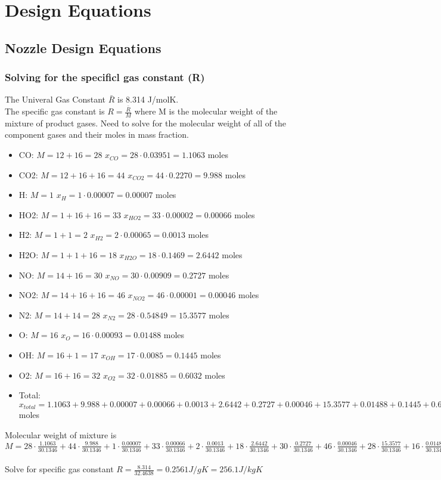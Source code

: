 \documentclass[12pt, letter paper]{article}
\begin{document}
	\section{Design Equations}
		\subsection{Nozzle Design Equations}
			\subsubsection{Solving for the specificl gas constant (R)}
				The Univeral Gas Constant $ \bar{R} $ is 8.314 J/molK. \\
				The specific gas constant is $ R = \frac{\bar{R}}{M} $ where M is the molecular weight of the mixture of product gases.
				Need to solve for the molecular weight of all of the component gases and their moles in mass fraction.
				\begin{itemize}
					\item CO: $ M = 12 +16 = 28 $ $x_{CO} = 28 \cdot 0.03951 = 1.1063 $ moles
					\item CO2: $ M = 12 + 16  + 16 = 44 $ $ x_{CO2} = 44 \cdot 0.2270 = 9.988 $ moles
					\item H: $ M = 1 $ $ x_{H} = 1 \cdot 0.00007 = 0.00007 $ moles
					\item HO2: $ M = 1 + 16 + 16 = 33 $ $ x_{HO2} = 33 \cdot 0.00002 = 0.00066 $ moles
					\item H2: $ M = 1 + 1 = 2 $ $ x_{H2} = 2 \cdot 0.00065 = 0.0013 $ moles
					\item H2O: $ M = 1 + 1 + 16 = 18 $ $ x_{H2O} = 18 \cdot 0.1469 = 2.6442 $ moles
					\item NO: $ M = 14 + 16 = 30 $ $ x_{NO} = 30 \cdot 0.00909 = 0.2727 $ moles
					\item NO2: $ M = 14 + 16 + 16 = 46 $ $ x_{NO2} = 46 \cdot 0.00001 = 0.00046 $ moles
					\item N2: $ M = 14 + 14 = 28 $ $ x_{N2} = 28 \cdot 0.54849 = 15.3577 $ moles
					\item O: $ M = 16 $ $ x_{O} = 16 \cdot 0.00093 = 0.01488 $ moles
					\item OH: $ M =16 + 1 = 17 $ $ x_{OH} = 17 \cdot 0.0085 = 0.1445 $ moles
					\item O2: $ M =16 + 16  = 32 $ $ x_{O2} = 32 \cdot 0.01885 = 0.6032 $ moles
					\item Total: $ x_{total} = 1.1063 + 9.988 + 0.00007 + 0.00066 + 0.0013 + 2.6442 + 0.2727 + 0.00046 + 15.3577 + 0.01488 + 0.1445 +0.6032 = 30.1346 $ moles
				\end{itemize}
				Molecular weight of mixture is $M = 28 \cdot \frac{1.1063}{30.1346} + 44 \cdot \frac{9.988}{30.1346} + 1 \cdot \frac{0.00007}{30.1346} + 33 \cdot \frac{0.00066}{30.1346} + 2 \cdot \frac{0.0013}{30.1346} + 18 \cdot \frac{2.6442}{30.1346} + 30 \cdot \frac{0.2727}{30.1346} + 46 \cdot \frac{0.00046}{30.1346} + 28 \cdot \frac{15.3577}{30.1346} + 16 \cdot \frac{0.01488}{30.1346} + 17 \cdot \frac{0.1445}{30.1346} + 32 \cdot \frac{0.6032}{30.1346} = 32.4638 g/mol$ \\ \\
				Solve for specific gas constant $ R = \frac{8.314}{32.4638} = 0.2561 J/gK = 256.1 J/kgK $ 
\end{document}
